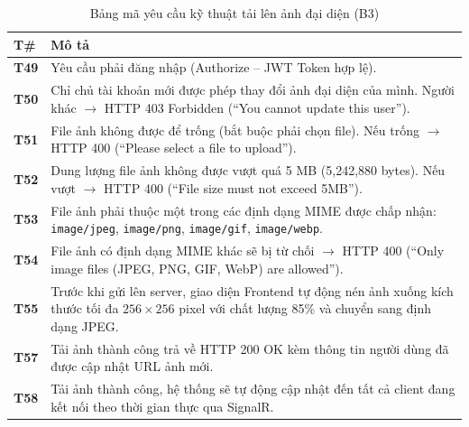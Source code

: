 \documentclass[11pt,a4paper]{article}
\begin{document}
\begin{table}[H]
\centering
\small
\begin{tabularx}{\textwidth}{|C{1.5cm}|X|}
\hline
{}
\textbf{T\#} & \textbf{Mô tả} \tabularnewline
\hline
\textbf{T49} & Yêu cầu phải đăng nhập (Authorize -- JWT Token hợp lệ). \\ \hline
\textbf{T50} & Chỉ chủ tài khoản mới được phép thay đổi ảnh đại diện của mình. Người khác $\rightarrow$ HTTP 403 Forbidden (``You cannot update this user''). \\ \hline
\textbf{T51} & File ảnh không được để trống (bắt buộc phải chọn file). Nếu trống $\rightarrow$ HTTP 400 (``Please select a file to upload''). \\ \hline
\textbf{T52} & Dung lượng file ảnh không được vượt quá 5 MB (5,242,880 bytes). Nếu vượt $\rightarrow$ HTTP 400 (``File size must not exceed 5MB''). \\ \hline
\textbf{T53} & File ảnh phải thuộc một trong các định dạng MIME được chấp nhận: \texttt{image/jpeg}, \texttt{image/png}, \texttt{image/gif}, \texttt{image/webp}. \\ \hline
\textbf{T54} & File ảnh có định dạng MIME khác sẽ bị từ chối $\rightarrow$ HTTP 400 (``Only image files (JPEG, PNG, GIF, WebP) are allowed''). \\ \hline
\textbf{T55} & Trước khi gửi lên server, giao diện Frontend tự động nén ảnh xuống kích thước tối đa $256\times256$ pixel với chất lượng 85\% và chuyển sang định dạng JPEG. \\ \hline
\textbf{T57} & Tải ảnh thành công trả về HTTP 200 OK kèm thông tin người dùng đã được cập nhật URL ảnh mới. \\ \hline
\textbf{T58} & Tải ảnh thành công, hệ thống sẽ tự động cập nhật đến tất cả client đang kết nối theo thời gian thực qua SignalR. \\ \hline
\end{tabularx}
\caption{Bảng mã yêu cầu kỹ thuật tải lên ảnh đại diện (B3)}
\end{table}
\end{document}
